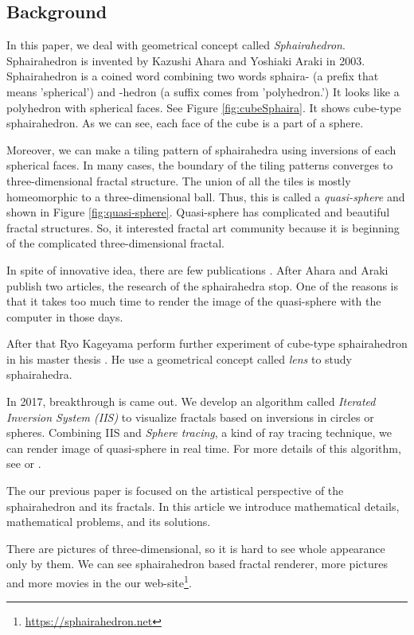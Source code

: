 \documentclass[dvipdfmx]{interact}
\theoremstyle{plain}%
\theoremstyle{definition}
\theoremstyle{remark}
\theoremstyle{problemstyle}
\begin{document}
\subsection{Background}

In this paper, we deal with geometrical concept called
\textit{Sphairahedron}. Sphairahedron is invented by Kazushi Ahara and
Yoshiaki Araki \cite{AharaAraki} in 2003. Sphairahedron is a coined word
combining two words sphaira- (a prefix that means 'spherical') and
-hedron (a suffix comes from 'polyhedron.') It looks like a polyhedron
with spherical faces. See Figure \ref{fig:cubeSphaira}. It shows cube-type
sphairahedron. As we can see, each face of the cube is a part of a
sphere.

Moreover, we can make a tiling pattern of sphairahedra using inversions
of each spherical faces. In many cases, the boundary of the tiling
patterns converges to three-dimensional fractal structure. 
The union of all the tiles is mostly homeomorphic to a three-dimensional
ball. Thus, this is called a \textit{quasi-sphere} and shown in Figure
\ref{fig:quasi-sphere}.
Quasi-sphere has complicated and beautiful fractal structures.
So, it interested fractal art community because it is beginning of
the complicated three-dimensional fractal.

In spite of innovative idea, there are few publications
\cite{AharaAraki}\cite{AharaJa}.
After Ahara and Araki publish two articles, the research of the
sphairahedra stop. 
One of the reasons is that it takes too much time to render the image of
the quasi-sphere with the computer in those days.

After that Ryo Kageyama perform further experiment of
cube-type sphairahedron in his master thesis \cite{kageyama}. 
He use a geometrical concept called \textit{lens} to study sphairahedra. 

In 2017, breakthrough is came out. We develop an algorithm called
\textit{Iterated Inversion System (IIS)} to visualize fractals based on
inversions in circles or spheres.
Combining IIS and \textit{Sphere tracing}, a kind of ray tracing
technique, we can render image of quasi-sphere in real time.
For more details of this algorithm, see
\cite{bridges2016} or \cite{bridges2017}.

The our previous paper \cite{bridges2018} is focused on the artistical
perspective of the sphairahedron and its fractals.
In this article we introduce mathematical details,
mathematical problems, and its solutions. 

There are pictures of three-dimensional, so it is hard to see whole
appearance only by them. We can see sphairahedron based fractal renderer,
 more pictures and more movies in the
our web-site\footnote{\url{https://sphairahedron.net}}.
\end{document}
